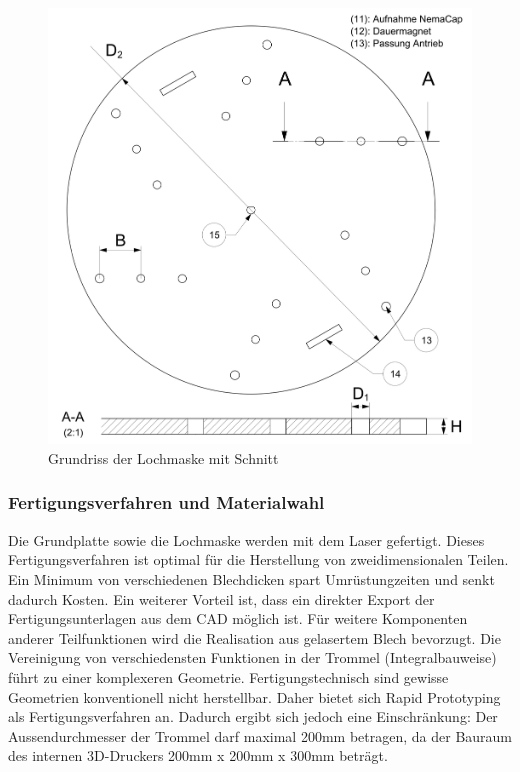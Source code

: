 	\begin{figure}[H]
	\includegraphics[scale=0.65]{Illustrationen/6-Umsetzung/detail_lochmaske.jpg}
	\caption{Grundriss der Lochmaske mit Schnitt}
	\label{fig:detail_lochmaske}
	\end{figure}
\subsubsection{Fertigungsverfahren und Materialwahl}
 Die Grundplatte sowie die Lochmaske werden mit dem Laser gefertigt. Dieses Fertigungsverfahren ist optimal für die Herstellung von zweidimensionalen Teilen. Ein Minimum von verschiedenen Blechdicken spart Umrüstungzeiten und senkt dadurch Kosten. Ein weiterer Vorteil ist, dass ein direkter Export der Fertigungsunterlagen aus dem CAD möglich ist. Für weitere Komponenten anderer Teilfunktionen wird die Realisation aus gelasertem Blech bevorzugt.
\newline
\newline
Die Vereinigung von verschiedensten Funktionen in der Trommel (Integralbauweise) führt zu einer komplexeren Geometrie. Fertigungstechnisch sind gewisse Geometrien konventionell nicht herstellbar. Daher bietet sich Rapid Prototyping als Fertigungsverfahren an. Dadurch ergibt sich jedoch eine Einschränkung: Der Aussendurchmesser der Trommel darf maximal 200mm betragen, da der Bauraum des internen 3D-Druckers 200mm x 200mm x 300mm beträgt. 

